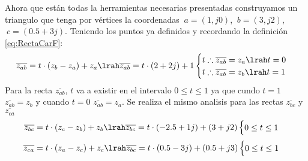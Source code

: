 Ahora que están todas la herramientas necesarias presentadas construyamos un triangulo que tenga por vértices la coordenadas $\ a=(1,j0)$, $\ b=(3,j2)$, $\ c=(0.5+3j)$. Teniendo los puntos ya definidos y recordando la definición \ref{eq:RectaCarF}:
\begin{equation}
    \overline{z_{ab}}=t\cdot(z_b-z_a)+z_a \lrah\overline{z_{ab}}=t\cdot(2+2j)+1
    \begin{cases}
        t\therefore\overline{z_{ab}}=z_a\lrah t=0\\
        t\therefore\overline{z_{ab}}=z_b\lrah t=1\\
    \end{cases}
\end{equation}
Para la recta $\overline{z_{ab}}$, $t$ va a existir en el intervalo $0\leq t\leq1$ ya que cundo $t=1$ $\overline{z_{ab}}=z_b$ y cuando $t=0$ $\overline{z_{ab}}=z_a$. Se realiza el mismo analisis para las rectas $\overline{z_{bc}}$ y $\overline{z_{ca}}$
\begin{equation}
    \overline{z_{bc}}=t\cdot(z_c-z_b)+z_b \lrah\overline{z_{bc}}=t\cdot(-2.5+1j)+(3+j2)
    \begin{cases}
        0\leq t\leq1
    \end{cases}
\end{equation}
\begin{equation}
    \overline{z_{ca}}=t\cdot(z_a-z_c)+z_c \lrah\overline{z_{bc}}=t\cdot(0.5-3j)+(0.5+j3)
    \begin{cases}
         0\leq t\leq1
    \end{cases}
\end{equation}
\begin{figure}[H]
    \centering
    
    \label{fig:TrianCF}
\end{figure}

